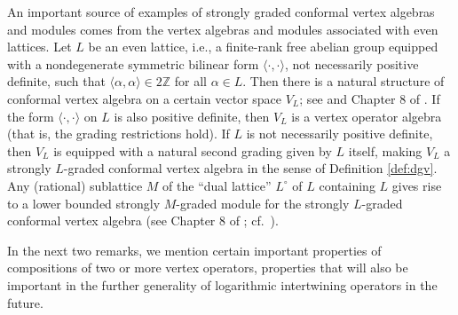 \documentclass[12pt]{article}
\begin{document}
\begin{exam}{\rm
An important source of examples of strongly graded conformal vertex
algebras and modules comes {}from the vertex algebras and modules
associated with even lattices.  Let $L$ be an even lattice, i.e., a
finite-rank free abelian group equipped with a nondegenerate symmetric
bilinear form $\langle\cdot,\cdot\rangle$, not necessarily positive
definite, such that $\langle \alpha,\alpha\rangle\in 2{\mathbb Z}$ for
all $\alpha\in L$.  Then there is a natural structure of conformal vertex algebra on
a certain vector space $V_L$; see \cite{B} and Chapter 8 of
\cite{FLM2}.  If the form $\langle\cdot,\cdot\rangle$ on $L$ is also
positive definite, then $V_L$ is a vertex operator algebra (that is,
the grading restrictions hold).  If $L$ is not necessarily positive
definite, then $V_L$ is equipped with a natural second grading given
by $L$ itself, making $V_L$ a strongly $L$-graded conformal vertex
algebra in the sense of Definition \ref{def:dgv}.  Any (rational)
sublattice $M$ of the ``dual lattice'' $L^{\circ}$ of $L$ containing
$L$ gives rise to a lower bounded strongly $M$-graded module for the strongly
$L$-graded conformal vertex algebra (see Chapter 8 of \cite{FLM2};
cf.\ \cite{LL}).}
\end{exam}

In the next two remarks, we mention certain important properties of
compositions of two or more vertex operators, properties that will
also be important in the further generality of logarithmic
intertwining operators in the future.
\end{document}
